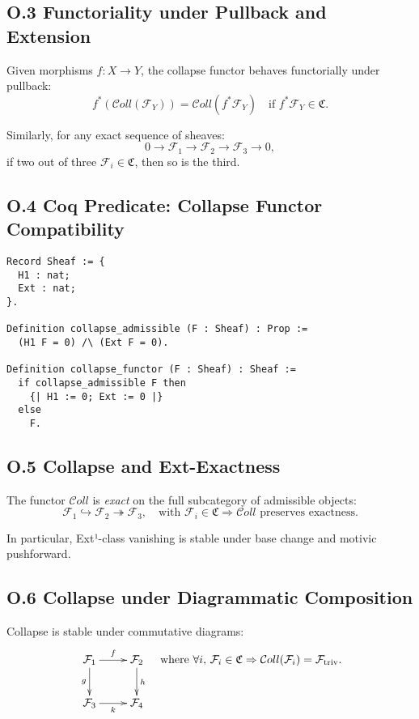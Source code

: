 \documentclass[11pt]{article}
\newcommand{\Coll}{\mathcal{C}oll}
\begin{document}
\subsection*{O.3 Functoriality under Pullback and Extension}

Given morphisms \( f: X \to Y \), the collapse functor behaves functorially under pullback:
\[
f^*(\Coll(\mathcal{F}_Y)) = \Coll(f^*\mathcal{F}_Y)
\quad \text{if } f^*\mathcal{F}_Y \in \mathfrak{C}.
\]

Similarly, for any exact sequence of sheaves:
\[
0 \to \mathcal{F}_1 \to \mathcal{F}_2 \to \mathcal{F}_3 \to 0,
\]
if two out of three \( \mathcal{F}_i \in \mathfrak{C} \), then so is the third.

\subsection*{O.4 Coq Predicate: Collapse Functor Compatibility}
\begin{lstlisting}[language=Coq]
Record Sheaf := {
  H1 : nat;
  Ext : nat;
}.

Definition collapse_admissible (F : Sheaf) : Prop :=
  (H1 F = 0) /\ (Ext F = 0).

Definition collapse_functor (F : Sheaf) : Sheaf :=
  if collapse_admissible F then
    {| H1 := 0; Ext := 0 |}
  else
    F.
\end{lstlisting}

\subsection*{O.5 Collapse and Ext-Exactness}

The functor \( \Coll \) is \emph{exact} on the full subcategory of admissible objects:
\[
\mathcal{F}_1 \hookrightarrow \mathcal{F}_2 \twoheadrightarrow \mathcal{F}_3, \quad
\text{with } \mathcal{F}_i \in \mathfrak{C} \Rightarrow \Coll \text{ preserves exactness.}
\]

In particular, Ext¹-class vanishing is stable under base change and motivic pushforward.

\subsection*{O.6 Collapse under Diagrammatic Composition}

Collapse is stable under commutative diagrams:
\[
\xymatrix{
\mathcal{F}_1 \ar[r]^f \ar[d]_g & \mathcal{F}_2 \ar[d]^h \\
\mathcal{F}_3 \ar[r]_k & \mathcal{F}_4
}
\quad \text{where } \forall i, \, \mathcal{F}_i \in \mathfrak{C} \Rightarrow \Coll(\mathcal{F}_i) = \mathcal{F}_{\mathrm{triv}}.
\]
\end{document}
